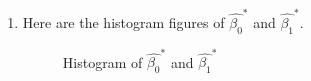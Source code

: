 \documentclass[12pt,letterpaper]{article}
\begin{document}
\begin{enumerate}[label=\textbf{(\Alph*)}]
\begin{enumerate}[label=(\roman*)]
\begin{table}[ht]
\begin{tabular}{lcc}
		\end{tabular}
	\end{table} 
	
\item	Here are the histogram figures of $\hat{\beta_0}^{*}$ and $\hat{\beta_1}^{*}$.
	\begin{figure}[H]
		\centering
		\caption{ Histogram of $\hat{\beta_0}^{*}$ and $\hat{\beta_1}^{*}$}
	\end{figure}
	
	

\end{enumerate}
\end{enumerate}
\end{document}
